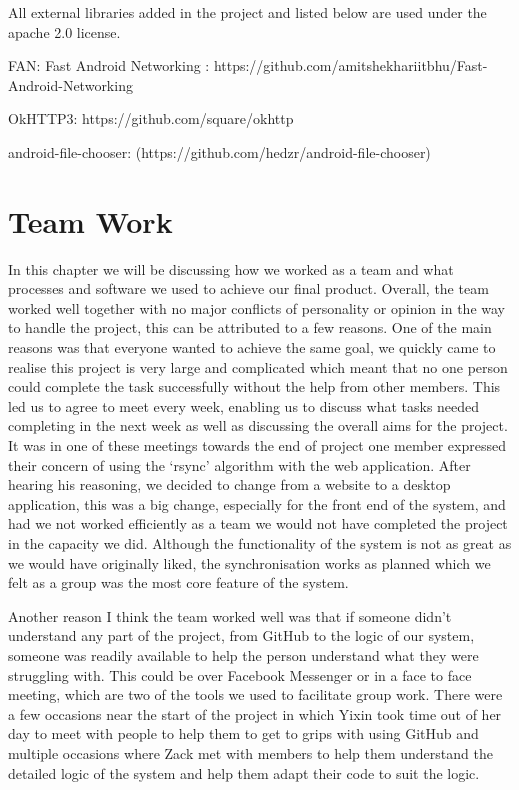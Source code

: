 \documentclass[11pt]{article}
\begin{document}
All external libraries added in the project and listed below are used under the apache 2.0 license. 

FAN: Fast Android Networking : https://github.com/amitshekhariitbhu/Fast-Android-Networking

	OkHTTP3: https://github.com/square/okhttp
	
android-file-chooser: (https://github.com/hedzr/android-file-chooser)


\section{Team Work}

In this chapter we will be discussing how we worked as a team and what processes and software we used to achieve our final product. Overall, the team worked well together with no major conflicts of personality or opinion in the way to handle the project, this can be attributed to a few reasons. One of the main reasons was that everyone wanted to achieve the same goal, we quickly came to realise this project is very large and complicated which meant that no one person could complete the task successfully without the help from other members. This led us to agree to meet every week, enabling us to discuss what tasks needed completing in the next week as well as discussing the overall aims for the project. It was in one of these meetings towards the end of project one member expressed their concern of using the ‘rsync’ algorithm with the web application. After hearing his reasoning, we decided to change from a website to a desktop application, this was a big change, especially for the front end of the system, and had we not worked efficiently as a team we would not have completed the project in the capacity we did. Although the functionality of the system is not as great as we would have originally liked, the synchronisation works as planned which we felt as a group was the most core feature of the system.

Another reason I think the team worked well was that if someone didn’t understand any part of the project, from GitHub to the logic of our system, someone was readily available to help the person understand what they were struggling with. This could be over Facebook Messenger or in a face to face meeting, which are two of the tools we used to facilitate group work. There were a few occasions near the start of the project in which Yixin took time out of her day to meet with people to help them to get to grips with using GitHub and multiple occasions where Zack met with members to help them understand the detailed logic of the system and help them adapt their code to suit the logic.
\end{document}
